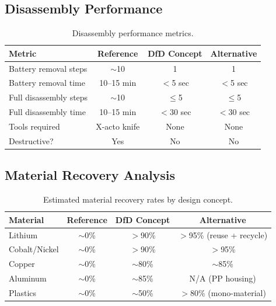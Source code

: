 \subsection{Disassembly Performance}

\begin{table}[H]
\centering
\caption{Disassembly performance metrics.}
\label{tab:disassembly_results}
\begin{tabular}{@{}lccc@{}}
\toprule
\textbf{Metric} & \textbf{Reference} & \textbf{DfD Concept} & \textbf{Alternative} \\
\midrule
Battery removal steps     & $\sim$10           & 1          & 1 \\
Battery removal time      & 10--15 min         & $<$5 sec   & $<$5 sec \\
Full disassembly steps    & $\sim$10           & $\leq$5    & $\leq$5 \\
Full disassembly time     & 10--15 min         & $<$30 sec  & $<$30 sec \\
Tools required            & X-acto knife       & None       & None \\
Destructive?              & Yes                & No         & No \\
\bottomrule
\end{tabular}
\end{table}

\subsection{Material Recovery Analysis}

\begin{table}[H]
\centering
\caption{Estimated material recovery rates by design concept.}
\label{tab:recovery}
\begin{tabular}{@{}lccc@{}}
\toprule
\textbf{Material} & \textbf{Reference} & \textbf{DfD Concept} & \textbf{Alternative} \\
\midrule
Lithium          & $\sim$0\% & $>$90\% & $>$95\% (reuse + recycle) \\
Cobalt/Nickel    & $\sim$0\% & $>$90\% & $>$95\% \\
Copper           & $\sim$0\% & $\sim$80\% & $\sim$85\% \\
Aluminum         & $\sim$0\% & $\sim$85\% & N/A (PP housing) \\
Plastics         & $\sim$0\% & $\sim$50\% & $>$80\% (mono-material) \\
\bottomrule
\end{tabular}
\end{table}

